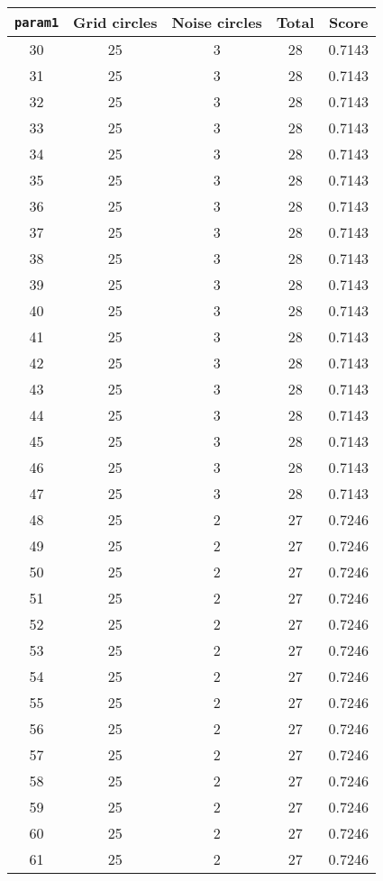 \documentclass[letterpaper, 12pt]{article}
\begin{document}
\begin{longtable}{|c|c|c|c|c|}
\hline
\textbf{\texttt{param1}} & \textbf{Grid circles} & \textbf{Noise circles} & \textbf{Total} & \textbf{Score} \\
\hline
30 & 25 & 3 & 28 & 0.7143 \\
\hline
31 & 25 & 3 & 28 & 0.7143 \\
\hline
32 & 25 & 3 & 28 & 0.7143 \\
\hline
33 & 25 & 3 & 28 & 0.7143 \\
\hline
34 & 25 & 3 & 28 & 0.7143 \\
\hline
35 & 25 & 3 & 28 & 0.7143 \\
\hline
36 & 25 & 3 & 28 & 0.7143 \\
\hline
37 & 25 & 3 & 28 & 0.7143 \\
\hline
38 & 25 & 3 & 28 & 0.7143 \\
\hline
39 & 25 & 3 & 28 & 0.7143 \\
\hline
40 & 25 & 3 & 28 & 0.7143 \\
\hline
41 & 25 & 3 & 28 & 0.7143 \\
\hline
42 & 25 & 3 & 28 & 0.7143 \\
\hline
43 & 25 & 3 & 28 & 0.7143 \\
\hline
44 & 25 & 3 & 28 & 0.7143 \\
\hline
45 & 25 & 3 & 28 & 0.7143 \\
\hline
46 & 25 & 3 & 28 & 0.7143 \\
\hline
47 & 25 & 3 & 28 & 0.7143 \\
\hline
48 & 25 & 2 & 27 & 0.7246 \\
\hline
49 & 25 & 2 & 27 & 0.7246 \\
\hline
50 & 25 & 2 & 27 & 0.7246 \\
\hline
51 & 25 & 2 & 27 & 0.7246 \\
\hline
52 & 25 & 2 & 27 & 0.7246 \\
\hline
53 & 25 & 2 & 27 & 0.7246 \\
\hline
54 & 25 & 2 & 27 & 0.7246 \\
\hline
55 & 25 & 2 & 27 & 0.7246 \\
\hline
56 & 25 & 2 & 27 & 0.7246 \\
\hline
57 & 25 & 2 & 27 & 0.7246 \\
\hline
58 & 25 & 2 & 27 & 0.7246 \\
\hline
59 & 25 & 2 & 27 & 0.7246 \\
\hline
60 & 25 & 2 & 27 & 0.7246 \\
\hline
61 & 25 & 2 & 27 & 0.7246 \\

\end{longtable}
\end{document}
